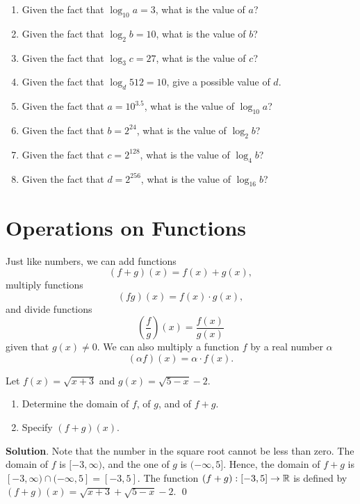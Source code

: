 \documentclass[11pt]{book}
\begin{document}
\begin{enumerate}[label=\arabic*.]
    \item Given the fact that $\log_{10}a=3$, what is the value of $a$?
    \item Given the fact that $\log_{2}b=10$, what is the value of $b$?
    \item Given the fact that $\log_{3}c=27$, what is the value of $c$?
    \item Given the fact that $\log_{d}512=10$, give a possible value of $d$.
    \item Given the fact that $a=10^{3.5}$, what is the value of $\log_{10}a$?
    \item Given the fact that $b=2^{24}$, what is the value of $\log_{2}b$?
    \item Given the fact that $c=2^{128}$, what is the value of $\log_{4}b$?
    \item Given the fact that $d=2^{256}$, what is the value of $\log_{16}b$?
\end{enumerate}

\vfill

\section{Operations on Functions}

\setlength{\delimitershortfall}{0pt}

Just like numbers, we can add functions $$(f+g)(x)=f(x)+g(x),$$ multiply functions $$(fg)(x)=f(x)\cdot g(x),$$ and divide functions $$\left(\dfrac{f}{g}\right)(x)=\dfrac{f(x)}{g(x)}$$ given that $g(x)\ne 0$. We can also multiply a function $f$ by a real number $\alpha$ $$(\alpha f)(x)=\alpha\cdot f(x).$$

\setlength{\delimitershortfall}{13.5pt}

\begin{example}
    Let $f(x)=\sqrt{x+3}$ and $g(x)=\sqrt{5-x}-2$.
    \begin{enumerate}
        \item Determine the domain of $f$, of $g$, and of $f+g$.
        \item Specify $(f+g)(x)$.
    \end{enumerate}
\end{example}
\textbf{Solution}. Note that the number in the square root cannot be less than zero. The domain of $f$ is $[-3, \infty)$, and the one of $g$ is $(-\infty, 5]$. Hence, the domain of $f+g$ is $[-3, \infty)\cap(-\infty, 5]=[-3, 5]$. The function $(f+g):[-3, 5]\to\mathbb{R}$ is defined by $(f+g)(x)=\sqrt{x+3}+\sqrt{5-x}-2$. \qed
\end{document}
